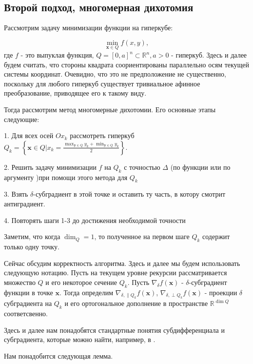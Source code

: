 \documentclass[12pt]{article}
\begin{document}
\subsection{Второй подход, многомерная дихотомия}

Рассмотрим задачу минимизации функции на гиперкубе:

$$\min_{\textbf{x}\in Q}f(x,y),$$
где $f$ - это выпуклая функция, $Q = [0,a]^n\subset \mathbb{R}^n, a >0$ - гиперкуб. Здесь и далее будем считать, что стороны квадрата соориентированы параллельно осям текущей системы координат. Очевидно, что это не предположение не существенно, поскольку для любого гиперкуб существует тривиальное афинное преобразование, приводящее его к такому виду.

Тогда рассмотрим метод многомерные дихотомии. Его основные этапы следующие:

1. Для всех осей $Ox_k$ рассмотреть гиперкуб $Q_k = \left\{\textbf{x} \in Q\Big| x_k = \frac{\max_{\textbf{y}\in Q} y_k + \min_{\textbf{y}\in Q} y_k}{2}\right\}$.

2. Решить задачу минимизации $f$ на $Q_k$ с точностью $\Delta$ (по функции или по аргументу )при помощи этого метода для $Q_k$

3. Взять $\delta$-субградиент в этой точке и оставить ту часть, в котору смотрит антиградиент.

4. Повторять шаги 1-3 до достижения необходимой точности

Заметим, что когда $\dim_Q=1$, то полученное на первом шаге $Q_k$ содержит только одну точку.

Сейчас обсудим корректность алгоритма. Здесь и далее мы будем использовать следующую нотацию. Пусть на текущем уровне рекурсии рассматривается множество $Q$ и его некоторое сечение $Q_k$. Пусть $\nabla_\delta f(\textbf{x})$ - $\delta$-субградиент функции в точке $\textbf{x}$. Тогда определим $\nabla_{\delta, \parallel Q_k} f(\textbf{x})$, $\nabla_{\delta, \perp Q_k} f(\textbf{x})$ - проекции $\delta$ субградиента на $Q_k$ и его ортогональное дополнение в пространстве $\mathbb{R}^{\dim Q}$ соответсвенно.

Здесь и далее нам понадобятся стандартные понятия субдифференциала и субградиента, которые можно найти, например, в \cite{nesterov2018lectures}.

Нам понадобится следующая лемма.
\end{document}
